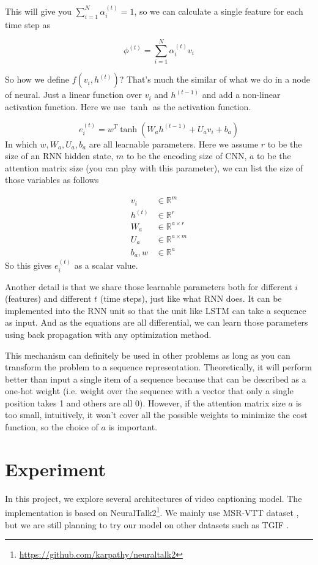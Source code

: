 This will give you $\sum_{i=1}^N\alpha_{i}^{(t)}=1$, so we can calculate a single feature for each time step as

\begin{equation}
\phi^{(t)}=\sum_{i=1}^N\alpha_{i}^{(t)}v_i
\end{equation}

So how we define $f(v_i,h^{(t)})$? That's much the similar of what we do in a node of neural. Just a linear function over $v_i$ and $h^{(t-1)}$ and add a non-linear activation function. Here we use $\tanh$ as the activation function.

\begin{equation}
e_{i}^{(t)} = w^T\tanh(W_ah^{(t-1)}+U_av_i+b_a)
\end{equation}
In which $w,W_a,U_a,b_a$ are all learnable parameters. Here we assume $r$ to be the size of an RNN hidden state, $m$ to be the encoding size of CNN, $a$ to be the attention matrix size (you can play with this parameter), we can list the size of those variables as follows

\begin{align}
v_i&\in \mathbb{R}^{m} \\
h^{(t)}&\in \mathbb{R}^{r}\\
W_a&\in \mathbb{R}^{a\times r}\\
U_a&\in \mathbb{R}^{a\times m}\\
b_a, w &\in \mathbb{R}^{a}
\end{align}
So this gives $e_i^{(t)}$ as a scalar value.

Another detail is that we share those learnable parameters both for different $i$ (features) and different $t$ (time steps), just like what RNN does. It can be implemented into the RNN unit so that the unit like LSTM can take a sequence as input. And as the equations are all differential, we can learn those parameters using back propagation with any optimization method.

This mechanism can definitely be used in other problems as long as you can transform the problem to a sequence representation. Theoretically, it will perform better than input a single item of a sequence because that can be described as a one-hot weight (i.e. weight over the sequence with a vector that only a single position takes 1 and others are all 0). However, if the attention matrix size $a$ is too small, intuitively, it won't cover all the possible weights to minimize the cost function, so the choice of $a$ is important.

\section{Experiment}
In this project, we explore several architectures of video captioning model. The implementation is based on NeuralTalk2\footnote{\url{https://github.com/karpathy/neuraltalk2}}. We mainly use MSR-VTT dataset \cite{xu2016msr}, but we are still planning to try our model on other datasets such as TGIF \cite{li2016tgif}.
